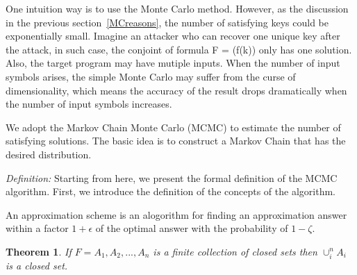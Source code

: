 One intuition way is to use the Monte Carlo method. However, 
as the discussion in the previous section~\ref{MCreasons},
the number of satisfying keys could be exponentially small. Imagine an attacker 
who can recover one unique key after the attack, in such case, 
the conjoint of formula F = (f(k)) only has one solution.
Also, the target program may have mutiple inputs. When the number of input
symbols arises, the simple Monte Carlo may suffer from the curse of dimensionality,
which means the accuracy of the result drops dramatically when the
number of input symbols increases. 

We adopt the Markov Chain Monte Carlo (MCMC) to estimate the number of 
satisfying solutions. The basic idea is to construct a Markov Chain that
has the desired distribution.

\textit{Definition:}
Starting from here, we present the formal definition of the MCMC algorithm.
First, we introduce the definition of the concepts of the algorithm.

\begin{mydef}
      An approximation scheme is an alogorithm for finding an approximation
      answer within a factor $1 + \epsilon$ of the optimal answer with the
      probability of $1 - \zeta$.
\end{mydef}

\newtheorem{theorem}{Theorem}[section]

\begin{theorem}
      If $F={A_1,A_2,...,A_n}$ is a finite collection of closed sets then 
      $\cup_{i}^{n}A_i$ is a closed set.
\end{theorem}